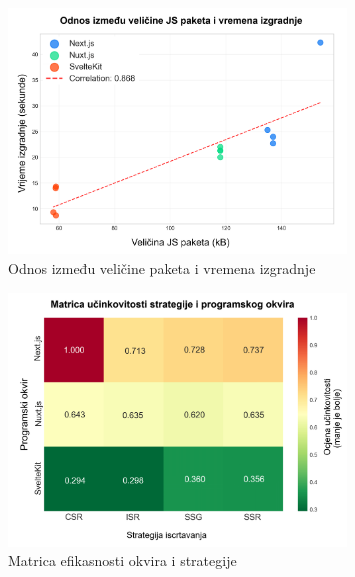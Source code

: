 \begin{figure}[H]
    \centering
    \includegraphics[width=0.8\textwidth]{slike/rezultati/dodatne-metrike/bundle_size_vs_build_time_correlation.png}
    \caption{Odnos između veličine paketa i vremena izgradnje}
    \label{fig:bundle_size_vs_build_time_correlation}
\end{figure}

\begin{figure}[H]
    \centering
    \includegraphics[width=0.8\textwidth]{slike/rezultati/dodatne-metrike/framework_strategy_efficiency_matrix.png}
    \caption{Matrica efikasnosti okvira i strategije}
    \label{fig:framework_strategy_efficiency_matrix}
\end{figure}

